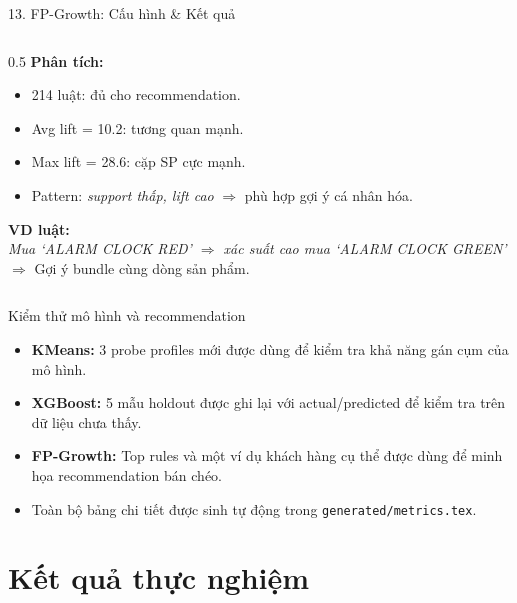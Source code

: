 \documentclass[10pt, aspectratio=169]{beamer}
\begin{document}
\begin{frame}{13. FP-Growth: Cấu hình \& Kết quả}
\begin{columns}[T]
        \begin{column}{0.5\textwidth}
            \textbf{Phân tích:}
            \begin{itemize}
                \item 214 luật: đủ cho recommendation.
                \item Avg lift = 10.2: tương quan mạnh.
                \item Max lift = 28.6: cặp SP cực mạnh.
                \item Pattern: \textit{support thấp, lift cao} $\Rightarrow$ phù hợp gợi ý cá nhân hóa.
            \end{itemize}
            
            \vspace{0.15cm}
            \textbf{VD luật:}\\
            \footnotesize
            \textit{Mua `ALARM CLOCK RED' $\Rightarrow$ xác suất cao mua `ALARM CLOCK GREEN'}\\
            $\Rightarrow$ Gợi ý bundle cùng dòng sản phẩm.
        \end{column}
    \end{columns}
\end{frame}

\begin{frame}{Kiểm thử mô hình và recommendation}
    \small
    \begin{itemize}
        \item \textbf{KMeans:} 3 probe profiles mới được dùng để kiểm tra khả năng gán cụm của mô hình.
        \item \textbf{XGBoost:} 5 mẫu holdout được ghi lại với actual/predicted để kiểm tra trên dữ liệu chưa thấy.
        \item \textbf{FP-Growth:} Top rules và một ví dụ khách hàng cụ thể được dùng để minh họa recommendation bán chéo.
        \item Toàn bộ bảng chi tiết được sinh tự động trong \texttt{generated/metrics.tex}.
    \end{itemize}
\end{frame}

\section{Kết quả thực nghiệm}
\end{document}
